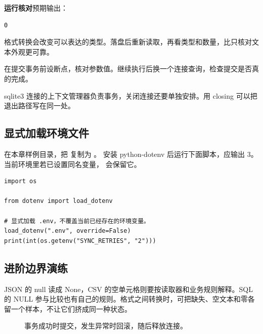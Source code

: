 \textbf{运行核对}\enspace 预期输出：
\begin{lstlisting}[language={},numbers=none]
0
\end{lstlisting}

\par

\begin{myunderstanding}
格式转换会改变可以表达的类型。落盘后重新读取，再看类型和数量，比只核对文本外观更可靠。
\end{myunderstanding}

\begin{pycharmpractice}
在提交事务前设断点，核对参数值。继续执行后换一个连接查询，检查提交是否真的完成。
\end{pycharmpractice}

\begin{pitfall}
sqlite3 连接的上下文管理器负责事务，关闭连接还要单独安排。用 closing 可以把退出路径写在同一处。
\end{pitfall}

\subsection*{显式加载环境文件}
在本章样例目录，把  复制为 。
安装 python-dotenv 后运行下面脚本，应输出 3。
当前环境里若已设置同名变量， 会保留它。


\begin{lstlisting}[title={\code{load_env.py}}]
import os

from dotenv import load_dotenv

# 显式加载 .env，不覆盖当前已经存在的环境变量。
load_dotenv(".env", override=False)
print(int(os.getenv("SYNC_RETRIES", "2")))
\end{lstlisting}

\par

\subsection*{进阶边界演练}
JSON 的 null 读成 None，CSV 的空单元格则要按读取器和业务规则解释。SQL 的 NULL 参与比较也有自己的规则。格式之间转换时，可把缺失、空文本和零各留一个样本，不让它们挤成同一种状态。

\begin{figure}[htbp]
\centering
{}
\caption{事务成功时提交，发生异常时回滚，随后释放连接。}
\label{fig:visual-ch10}
\end{figure}
